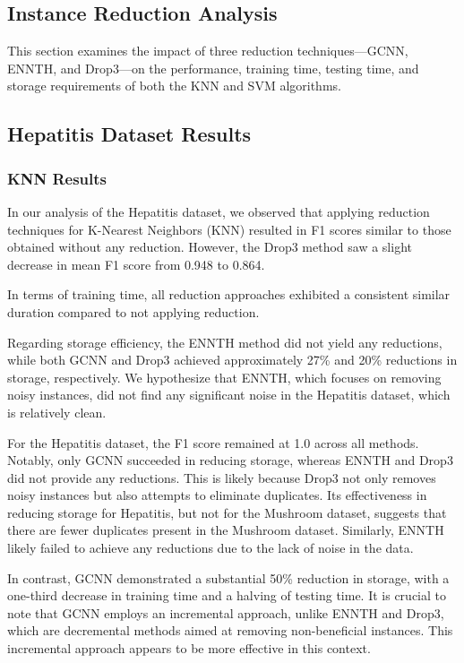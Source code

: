 \subsection{Instance Reduction Analysis}
\label{subsubsec:discussion-reduction}

This section examines the impact of three reduction techniques—GCNN, ENNTH, and Drop3—on the performance, training time, testing time, and storage requirements of both the KNN and SVM algorithms.

\subsection*{Hepatitis Dataset Results}
\subsubsection*{KNN Results}
In our analysis of the Hepatitis dataset, we observed that applying reduction techniques
for K-Nearest Neighbors (KNN) resulted in F1 scores similar to those obtained without any reduction.
However, the Drop3 method saw a slight decrease in mean F1 score from 0.948 to 0.864. 

In terms of training time, all reduction approaches exhibited a consistent similar duration compared to not applying reduction.

Regarding storage efficiency, the ENNTH method did not yield any reductions, while both GCNN and Drop3 achieved approximately
27\% and 20\% reductions in storage, respectively. We hypothesize that ENNTH, which focuses on removing noisy instances, did not
find any significant noise in the Hepatitis dataset, which is relatively clean.

For the Hepatitis dataset, the F1 score remained at 1.0 across all methods. Notably, only GCNN succeeded in reducing storage,
whereas ENNTH and Drop3 did not provide any reductions. This is likely because Drop3 not only removes noisy instances but also
attempts to eliminate duplicates. Its effectiveness in reducing storage for Hepatitis, but not for the Mushroom dataset, suggests
that there are fewer duplicates present in the Mushroom dataset. Similarly, ENNTH likely failed to achieve any reductions due to the lack of noise in the data.

In contrast, GCNN demonstrated a substantial 50\% reduction in storage, with a one-third decrease in training time and a halving of testing time. It is crucial to note that GCNN employs an incremental approach, unlike ENNTH and Drop3, which are decremental methods aimed at removing non-beneficial instances. This incremental approach appears to be more effective in this context.

